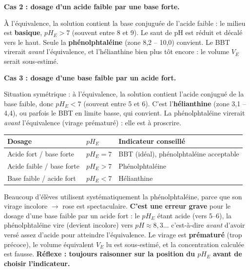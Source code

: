 \documentclass[11pt]{article}
\begin{document}
\textbf{Cas 2 : dosage d'un acide faible par une base forte.}\par
À l'équivalence, la solution contient la base conjuguée de l'acide faible : le milieu est \textbf{basique}, $pH_E > 7$ (souvent entre 8 et 9). Le saut de pH est réduit et décalé vers le haut. Seule la \textbf{phénolphtaléine} (zone 8,2 -- 10,0) convient. Le BBT virerait \emph{avant} l'équivalence, et l'hélianthine bien plus tôt encore : le volume $V_E$ serait sous-estimé.

\textbf{Cas 3 : dosage d'une base faible par un acide fort.}\par
Situation symétrique : à l'équivalence, la solution contient l'acide conjugué de la base faible, donc $pH_E < 7$ (souvent entre 5 et 6). C'est l'\textbf{hélianthine} (zone 3,1 -- 4,4), ou parfois le BBT en limite basse, qui convient. La phénolphtaléine virerait \emph{avant} l'équivalence (virage prématuré) : elle est à proscrire.

\begin{aretenir}
\begin{center}
\begin{tabularx}{\linewidth}{|X|X|X|}
\hline
\rowcolor{popblueL} \textbf{Dosage} & \textbf{$pH_E$} & \textbf{Indicateur conseillé} \\
\hline
Acide fort / base forte & $pH_E = 7$ & BBT (idéal), phénolphtaléine acceptable \\
Acide faible / base forte & $pH_E > 7$ & Phénolphtaléine \\
Base faible / acide fort & $pH_E < 7$ & Hélianthine \\
\hline
\end{tabularx}
\end{center}
\end{aretenir}

\begin{attention}
Beaucoup d'élèves utilisent systématiquement la phénolphtaléine, parce que son virage incolore $\to$ rose est spectaculaire. \textbf{C'est une erreur grave} pour le dosage d'une base faible par un acide fort : le $pH_E$ étant acide (vers 5--6), la phénolphtaléine vire (devient incolore) vers $pH \approx 8,3$... c'est-à-dire \emph{avant} d'avoir versé assez d'acide pour atteindre l'équivalence. Le virage est \textbf{prématuré} (trop précoce), le volume équivalent $V_E$ lu est sous-estimé, et la concentration calculée est fausse. \textbf{Réflexe : toujours raisonner sur la position du $pH_E$ avant de choisir l'indicateur.}
\end{attention}
\end{document}
